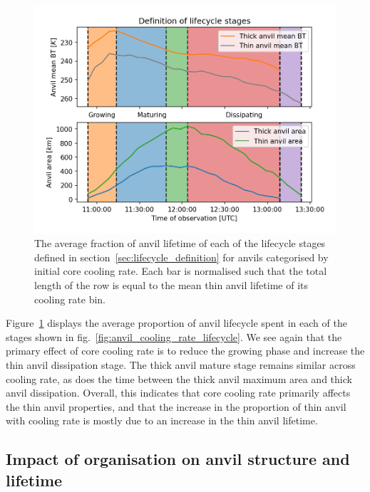 \begin{figure}[tp]
    \centering
    \includegraphics[width=\textwidth]{figures/chapter3_07.png}
    \caption[
    The average fraction of anvil lifetime of each lifecycle stage for anvils categorised by initial core cooling rate
    ]{
    The average fraction of anvil lifetime of each of the lifecycle stages defined in section~\ref{sec:lifecycle_definition} for anvils categorised by initial core cooling rate. Each bar is normalised such that the total length of the row is equal to the mean thin anvil lifetime of its cooling rate bin.
    }
    \label{fig:anvil_cooling_rate_proportional_lifecycle}
\end{figure}

Figure~\ref{fig:anvil_cooling_rate_proportional_lifecycle} displays the average proportion of anvil lifecycle spent in each of the stages shown in fig.~\ref{fig:anvil_cooling_rate_lifecycle}.
We see again that the primary effect of core cooling rate is to reduce the growing phase and increase the thin anvil dissipation stage.
The thick anvil mature stage remains similar across cooling rate, as does the time between the thick anvil maximum area and thick anvil dissipation.
Overall, this indicates that core cooling rate primarily affects the thin anvil properties, and that the increase in the proportion of thin anvil with cooling rate  is mostly due to an increase in the thin anvil lifetime.

\subsection{Impact of organisation on anvil structure and lifetime}

